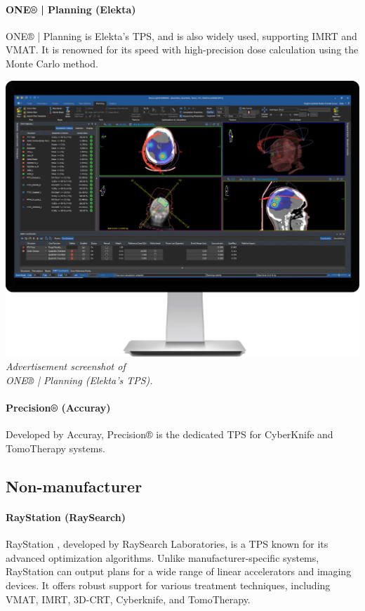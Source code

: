 \paragraph{ONE® | Planning (Elekta)}
\begin{multicols}{2}
	ONE® | Planning \cite{one_planning} is Elekta's TPS, and is also widely used, supporting IMRT and VMAT.
	It is renowned for its speed with high-precision dose calculation using the Monte Carlo method.
	
	\columnbreak
	
	\centering
	\includegraphics[width=\linewidth]{OnePlanningElekta.png}
	\textit{Advertisement screenshot of \\ ONE® | Planning (Elekta's TPS).}
\end{multicols}

\paragraph{Precision® (Accuray)}
Developed by Accuray, Precision® \cite{precision} is the dedicated TPS for CyberKnife and TomoTherapy systems.

\subsection{Non-manufacturer}
\paragraph{RayStation (RaySearch)}
RayStation \cite{raystation}, developed by RaySearch Laboratories, is a TPS known for its advanced optimization algorithms.
Unlike manufacturer-specific systems, RayStation can output plans for a wide range of linear accelerators and imaging devices.
It offers robust support for various treatment techniques, including VMAT, IMRT, 3D-CRT, Cyberknife, and TomoTherapy.

